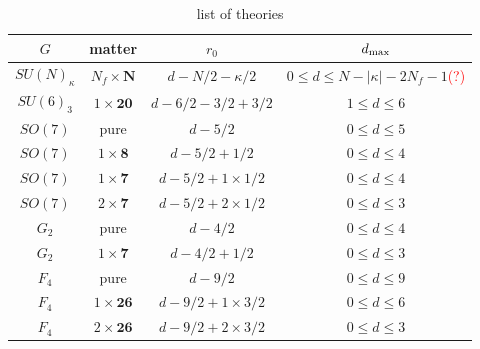 \documentclass[letterpaper, 11pt]{article}
\def\k{\kappa}
\begin{document}
{\begin{table}[p]
  \centering
  \begin{tabular}{|c|c|c|c|}
    \hline
    $G$ & matter & $r_0$ & $d_{\rm max}$\\
    \hline
    $SU(N)_\kappa$ & $N_f\times\boldsymbol{N}$ & $d-N/2-\kappa/2$ & $0\leq d \leq N-|\kappa|-2N_f-1$\textcolor{red}{(?)}\\
    \hline
    $SU(6)_{3}$ & $1\times\boldsymbol{20}$ & $d-6/2-3/2+3/2$ & $1\leq d\leq 6$\\
    \hline
    $SO(7)$ & pure & $d-5/2$ & $0\leq d \leq 5$\\
    \hline
    $SO(7)$ & $1\times\textbf{8}$ & $d-5/2+1/2$ & $0\leq d\leq 4$\\
    \hline
    $SO(7)$ & $1\times\textbf{7}$ & $d-5/2+1\times1/2$ & $0\leq d\leq 4$\\
    \hline
    $SO(7)$ & $2\times\textbf{7}$ & $d-5/2+2\times1/2$ & $0\leq d\leq 3$\\
    \hline
    $G_2$ & pure & $d-4/2$ & $0\leq d \leq 4$\\
    \hline
    $G_2$ & $1\times\textbf{7}$ & $d-4/2+1/2$ & $0\leq d\leq 3$\\
    \hline
    $F_4$ & pure & $d-9/2$ & $0\leq d \leq 9$\\
    \hline
    $F_4$ & $1\times\textbf{26}$ & $d-9/2+1\times 3/2$ & $0\leq d\leq 6$\\
    \hline
    $F_4$ & $2\times\textbf{26}$ & $d-9/2+2\times 3/2$ & $0\leq d\leq 3$\\
    \hline
    \end{tabular}
    \caption{list of theories}
    \label{tbl:list}
\vspace{1cm}
\end{table}





}
\end{document}
